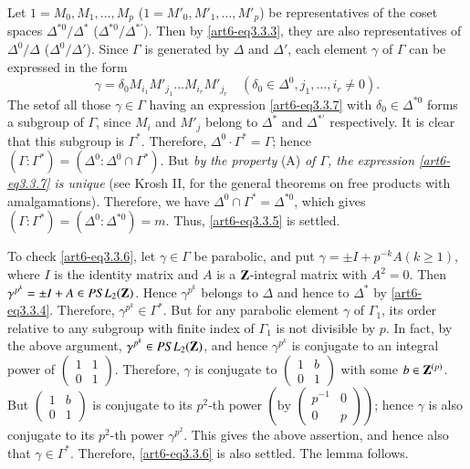 Let $1 = M_0, M_1, \ldots, M_p$ (\resp $1 = M'_0, M'_1, \ldots, M'_p$) be representatives of the coset spaces $\Delta^{\ast 0} /\Delta^\ast$ (\resp $\Delta^{\ast 0} / \Delta^{\ast'}$). Then by \eqref{art6-eq3.3.3}, they are also representatives of $\Delta^0/ \Delta$ (\resp $\Delta^0/ \Delta'$). Since $\Gamma$ is generated by $\Delta$ and $\Delta'$, each element $\gamma$ of $\Gamma$ can be expressed in the form
\begin{equation}
\gamma = \delta_{0} M_{i_1} M'_{j_1} \ldots M_{i_r} M'_{j_r} \quad (\delta_0 \in \Delta^0, j_1, \ldots , i_r \neq 0). 
\label{art6-eq3.3.7}
\end{equation}
The set\pageoriginale of all those $\gamma \in \Gamma$ having an expression \eqref{art6-eq3.3.7} with $\delta_0 \in \Delta^{\ast 0}$ forms a subgroup of $\Gamma$, since $M_i$ and $M'_j$ belong to $\Delta^\ast$ and $\Delta^{\ast'}$ respectively. It is clear that this subgroup is $\Gamma^\ast$. Therefore, $\Delta^0 \cdot \Gamma^\ast  = \Gamma$; hence $(\Gamma : \Gamma^\ast) = (\Delta^0 : \Delta^0 \cap \Gamma^\ast)$. But \textit{by the property} (A) \textit{ of $\Gamma$, the expression \eqref{art6-eq3.3.7} is unique} (see Krosh \cite{art6-key10} II, for the general theorems on free products with amalgamations). Therefore, we have $\Delta^0 \cap \Gamma^\ast = \Delta^{\ast 0}$, which gives $(\Gamma : \Gamma^\ast) = (\Delta^0 : \Delta^{\ast 0}) =m$. Thus,  \eqref{art6-eq3.3.5} is settled.

To check \eqref{art6-eq3.3.6}, let $\gamma \in \Gamma$ be parabolic, and put $\gamma = \pm I + p^{-k}A (k \geqslant 1)$, where $I$ is the identity matrix and $A$ is a $\mathbf{Z}$-integral matrix with $A^2=0$. Then $\gamma^{p^k} = \pm I + A \in PSL_2 (\mathbf{Z})$. Hence $\gamma^{p^k}$ belongs to $\Delta$ and hence to $\Delta^\ast$ by \eqref{art6-eq3.3.4}. Therefore, $\gamma^{p^k} \in \Gamma^\ast$. But for any parabolic element $\gamma$ of $\Gamma_1$, its order relative to any subgroup with finite index of $\Gamma_1$ is not divisible by $p$. In fact, by the above argument, $\gamma^{p^k} \in PSL_2 (\mathbf{Z})$, and hence $\gamma^{p^k}$ is conjugate to an integral power of $\begin{pmatrix}1 & 1 \\0 & 1\end{pmatrix}$. Therefore, $\gamma$ is conjugate to 
$\begin{pmatrix}
1 & b \\ 0 & 1 \end{pmatrix}$ with some $b \in \mathbf{Z}^{(p)}$. But $\begin{pmatrix}
1 & b\\ 0 & 1
\end{pmatrix}$ is conjugate to its $p^2$-th power $\left(\text{by } \begin{pmatrix}
p^{-1} & 0\\ 0 & p
\end{pmatrix}\right)$; hence $\gamma$ is also conjugate to its $p^2$-th power $\gamma^{p^2}$. This gives the above assertion, and hence also that $\gamma \in \Gamma^\ast$. Therefore, \eqref{art6-eq3.3.6} is also settled. The lemma follows.


